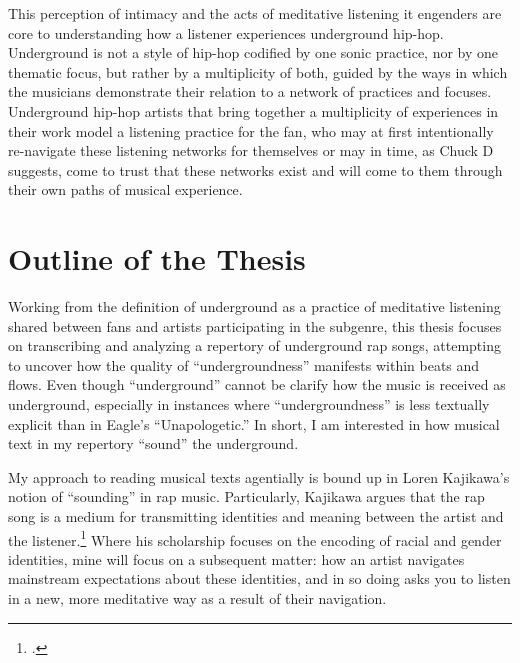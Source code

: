 This perception of intimacy and the acts of meditative listening it engenders are core to understanding how a listener
experiences underground hip-hop. Underground is not a style of hip-hop codified by one sonic practice, nor by one thematic
focus, but rather by a multiplicity of both, guided by the ways in which the musicians demonstrate their relation to a
network of practices and focuses. Underground hip-hop artists that bring together a multiplicity of experiences in their
work model a listening practice for the fan, who may at first intentionally re-navigate these listening networks for themselves
or may in time, as Chuck D suggests, come to trust that these networks exist and will come to them through their own paths of
musical experience.


\section{Outline of the Thesis}

Working from the definition of underground as a practice of meditative listening shared between fans and artists 
participating in the subgenre, this thesis focuses on transcribing and analyzing a repertory of underground rap songs, 
attempting to uncover how the quality of ``undergroundness'' manifests within beats and flows. Even though ``underground''
cannot be clarify how  the music is received as underground, especially in instances where ``undergroundness'' is less 
textually explicit than in Eagle's ``Unapologetic.'' In short, I am interested in how musical text in my repertory 
``sound'' the underground.

My approach to reading musical texts agentially is bound up in Loren Kajikawa's notion of ``sounding'' in rap music. 
Particularly, Kajikawa argues that the rap song is a medium for transmitting identities and meaning between the artist
and the listener.\footnote{
    \autocite[2]{lorenkajikawaSoundingRaceRap2015}.}
Where his scholarship focuses on the encoding of racial and gender identities, mine will focus on a subsequent matter:
how an artist navigates mainstream expectations about these identities, and in so doing asks you to listen in a new, more
meditative way as a result of their navigation.

